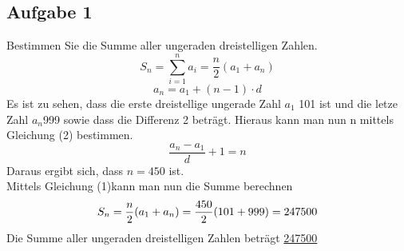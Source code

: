 \documentclass[18pt,a4paper]{article}
\begin{document}
\subsection*{Aufgabe 1}
Bestimmen Sie die Summe aller ungeraden dreistelligen Zahlen.\\
\begin{equation}
\displaystyle S_n = \sum_{i=1}^{n} a_i = \frac{n}{2}(a_1 +a_n)
\end{equation}
\begin{equation}
a_n = a_1 + (n-1) \cdot d
\end{equation}
Es ist zu sehen, dass die erste dreistellige ungerade Zahl $a_1$ 101 ist und die letze Zahl $a_n$999 sowie dass die Differenz 2 beträgt. Hieraus kann man nun n mittels Gleichung (2) bestimmen.
\begin{equation}
\frac{a_n - a_1}{d} + 1 =n
\end{equation}
Daraus ergibt sich, dass $n=450$ ist.\\
Mittels Gleichung (1)kann man nun die Summe berechnen\\
\begin{equation*}
S_n =\\
\frac{n}{2}(a_1 +a_n)=\\
\frac{450}{2}(101 +999)=\\
247500
\end{equation*}
Die Summe aller ungeraden dreistelligen Zahlen beträgt \underline{247500}
\end{document}
